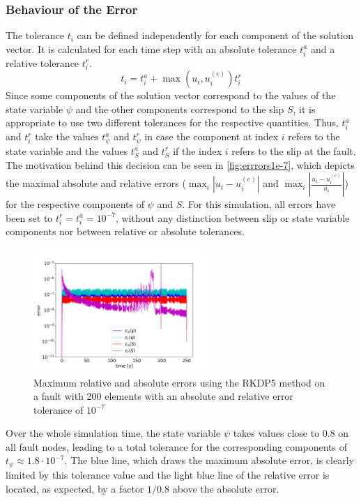 \subsubsection{Behaviour of the Error}
The tolerance $t_i$ can be defined independently for each component of the solution vector. It is calculated for each time step with an absolute tolerance $t_i^a$ and a relative tolerance $t_i^r$. 
\begin{equation}
t_i = t_i^a + \max\left(u_i,u_i^{(e)}\right)t_i^r
\end{equation}
Since some components of the solution vector correspond to the values of the state variable $\psi$ and the other components correspond to the slip $S$, it is appropriate to use two different tolerances for the respective quantities. Thus, $t_i^a$ and $t_i^r$ take the values $t_\psi^a$ and $t_\psi^r$ in case the component at index $i$ refers to the state variable and the values $t_S^a$ and $t_S^r$ if the index $i$ refers to the slip at the fault. The motivation behind this decision can be seen in \autoref{fig:errrors1e-7}, which depicts the maximal absolute and relative errors ($\max_i\left|u_i-u_i^{(e)}\right|$ and $\max_i\left|\frac{u_i-u_i^{(e)}}{u_i}\right|$) for the respective components of $\psi$ and $S$. For this simulation, all errors have been set to $t_i^r = t_i^a = 10^{-7}$, without any distinction between slip or state variable components nor between relative or absolute tolerances.
\begin{figure}[H]
	\centering
	\includegraphics[width=0.6\textwidth]{images/TANDEMtimeEvolutionErrorall_RKDP5.png}
	\caption{Maximum relative and absolute errors using the RKDP5 method on a fault with 200 elements with an absolute and relative error tolerance of $10^{-7}$}
	\label{fig:errrors1e-7}
\end{figure}
Over the whole simulation time, the state variable $\psi$ takes values close to $0.8$ on all fault nodes, leading to a total tolerance for the corresponding components of $t_\psi \approx 1.8 \cdot 10^{-7}$. The blue line, which draws the maximum absolute error, is clearly limited by this tolerance value and the light blue line of the relative error is located, as expected, by a factor $1/0.8$ above the absolute error. \\
